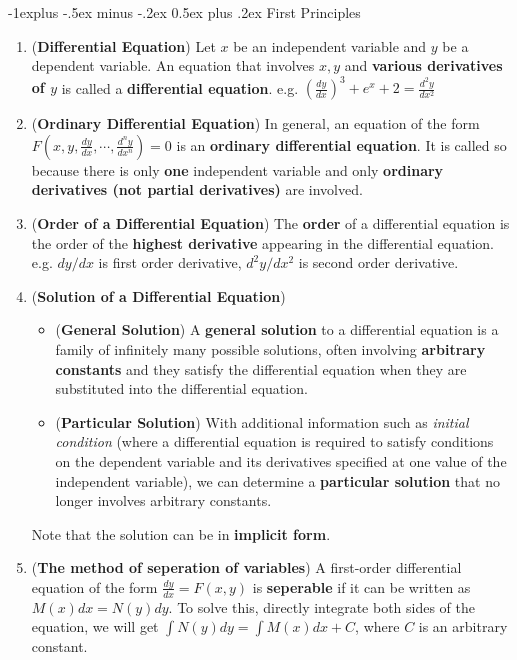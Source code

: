 \documentclass[10pt, landscape]{article}
\makeatletter
\renewcommand{\subsection}{\@startsection{subsection}{2}{0mm}%
                                {-1explus -.5ex minus -.2ex}%
                                {0.5ex plus .2ex}%
                                {\normalfont\normalsize\bfseries}}
\makeatother
\begin{document}
\begin{multicols}{4}
\subsection{First Principles}
\begin{enumerate}
    \item (\textbf{Differential Equation}) Let $x$ be an independent variable and $y$ be a dependent variable. An equation that involves $x,y$ and \textbf{various derivatives of $y$} is called a \textbf{differential equation}. e.g. $(\frac{dy}{dx})^3+e^x+2=\frac{d^2y}{dx^2}$
    \item (\textbf{Ordinary Differential Equation}) In general, an equation of the form $F(x,y,\frac{dy}{dx}, \cdots, \frac{d^ny}{dx^n})=0$ is an \textbf{ordinary differential equation}. It is called so because there is only \textbf{one} independent variable and only \textbf{ordinary derivatives (not partial derivatives)} are involved.
    \item (\textbf{Order of a Differential Equation}) The \textbf{order} of a differential equation is the order of the \textbf{highest derivative} appearing in the differential equation. e.g. $dy/dx$ is first order derivative, $d^2y/dx^2$ is second order derivative.
    \item (\textbf{Solution of a Differential Equation})
    \begin{itemize} 
        \item (\textbf{General Solution}) A \textbf{general solution} to a differential equation is a family of infinitely many possible solutions, often involving \textbf{arbitrary constants} and they satisfy the differential equation when they are substituted into the differential equation.
        \item (\textbf{Particular Solution}) With additional information such as \textit{initial condition} (where a differential equation is required to satisfy conditions on the dependent variable and its derivatives specified at one value of the independent variable), we can determine a \textbf{particular solution} that no longer involves arbitrary constants.
    \end{itemize}
    Note that the solution can be in \textbf{implicit form}.
    \item (\textbf{The method of seperation of variables}) A first-order differential equation of the form $\frac{dy}{dx}=F(x,y)$ is \textbf{seperable} if it can be written as $M(x)dx=N(y)dy$. To solve this, directly integrate both sides of the equation, we will get $\int N(y)dy=\int M(x)dx+C$, where $C$ is an arbitrary constant.

\end{enumerate}
\end{multicols}
\end{document}
